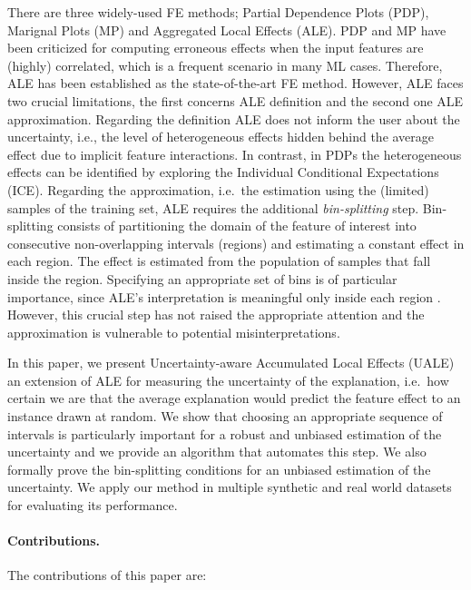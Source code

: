 \documentclass[twoside]{article}
\begin{document}
There are
three widely-used FE methods; Partial Dependence Plots
(PDP)\citep{friedman2001greedy}, Marignal Plots
(MP)\citep{apley2020visualizing} and Aggregated Local Effects
(ALE)\citep{apley2020visualizing}. PDP and MP have been criticized for
computing erroneous effects when the input features are (highly)
correlated, which is a frequent scenario in many ML cases. Therefore,
ALE has been established as the state-of-the-art FE method. However, ALE faces two crucial limitations, the first concerns ALE
definition and the second one ALE approximation. Regarding the
definition ALE does not inform the user about the uncertainty, i.e.,
the level of heterogeneous effects hidden behind the average effect
due to implicit feature interactions. In contrast, in PDPs the
heterogeneous effects can be identified by exploring the
Individual Conditional Expectations
(ICE)\citep{goldstein2015peeking}. Regarding the approximation,
i.e.~the estimation using the (limited) samples of the training set,
ALE requires the additional \textit{bin-splitting} step. Bin-splitting
consists of partitioning the domain of the feature of interest into consecutive non-overlapping intervals (regions) and estimating a
constant effect in each region. The effect is estimated from the population of samples that fall
inside the region. Specifying an appropriate set of bins is of particular
importance, since ALE's interpretation is meaningful only inside each
region \citep{molnar2022}. However, this crucial step has not raised
the appropriate attention and the approximation is vulnerable to
potential misinterpretations.

In this paper, we present Uncertainty-aware Accumulated Local Effects
(UALE) an extension of ALE for measuring the uncertainty of the
explanation, i.e.~how certain we are that the average explanation
would predict the feature effect to an instance drawn at random. We
show that choosing an appropriate sequence of intervals is
particularly important for a robust and unbiased estimation of the
uncertainty and we provide an algorithm that automates this step. We
also formally prove the bin-splitting conditions for an unbiased
estimation of the uncertainty. We apply our method in multiple
synthetic and real world datasets for evaluating its performance.

\paragraph{Contributions.} The contributions of this paper are:
\end{document}
